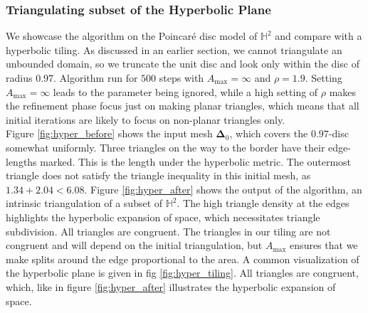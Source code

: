 \subsubsection*{Triangulating subset of the Hyperbolic Plane}
    We showcase the algorithm on the Poincaré disc model of $\mathbb{H}^2$ and compare with a hyperbolic tiling. As discussed in an earlier section, we cannot triangulate an unbounded domain, so we truncate the unit disc and look only within the disc of radius $0.97$. Algorithm run for $500$ steps with $A_{\text{max}} = \infty$ and $\rho = 1.9$. Setting $A_{\text{max}} = \infty$ leads to the parameter being ignored, while a high setting of $\rho$ makes the refinement phase focus just on making planar triangles, which means that all initial iterations are likely to focus on non-planar triangles only. 
    \\
    Figure \ref{fig:hyper_before} shows the input mesh $\mathbf{\Delta}_0$, which covers the $0.97$-disc somewhat uniformly. Three triangles on the way to the border have their edge-lengths marked. This is the length under the hyperbolic metric. The outermost triangle does not satisfy the triangle inequality in this initial mesh, as $1.34 + 2.04 < 6.08$. Figure \ref{fig:hyper_after} shows the output of the algorithm, an intrinsic triangulation of a subset of $\mathbb{H}^2$. The high triangle density at the edges highlights the hyperbolic expansion of space, which necessitates triangle subdivision. All triangles are congruent. The triangles in our tiling are not congruent and will depend on the initial triangulation, but $A_{\text{max}}$ ensures that we make splits around the edge proportional to the area. A common visualization of the hyperbolic plane is given in fig \ref{fig:hyper_tiling}. All triangles are congruent, which, like in figure \ref{fig:hyper_after} illustrates the hyperbolic expansion of space.
    \\

